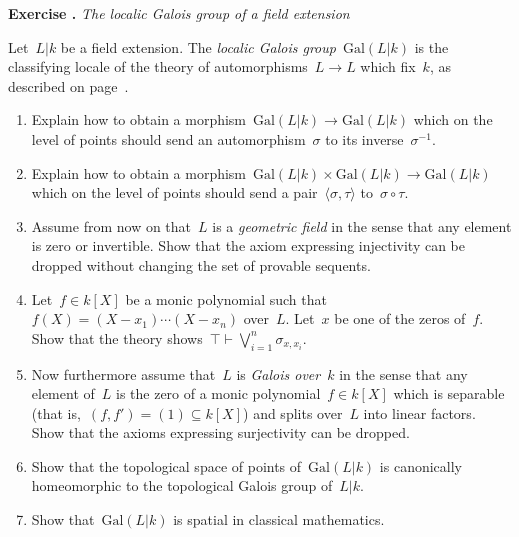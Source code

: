 \documentclass{ws-rv9x6}
\newlength{\exerciseskip}
\newcounter{exercisenr}
\newenvironment{exercise}[1]{
  \refstepcounter{exercisenr}
  \noindent\textbf{Exercise \theexercisenr{}.} \emph{#1} \smallskip\par\noindent%
}{\par\vspace{\exerciseskip}}
\newcommand{\Gal}{\mathrm{Gal}}
\renewcommand{\_}{\mathpunct{.}}
\newcommand{\?}{\,{:}\,}
\begin{document}
\begin{exercise}{The localic Galois group of a field extension}%
Let~$L|k$ be a field extension. The \emph{localic Galois group}~$\Gal(L|k)$
is the classifying locale of the theory of automorphisms~$L \to L$ which
fix~$k$, as described on page~\pageref{par:theory-automorphisms}.
\begin{enumerate}
\item Explain how to obtain a morphism~$\Gal(L|k) \to \Gal(L|k)$ which on the
level of points should send an automorphism~$\sigma$ to its inverse~$\sigma^{-1}$.
\item Explain how to obtain a morphism~$\Gal(L|k) \times \Gal(L|k) \to \Gal(L|k)$ which on the
level of points should send a pair~$\langle \sigma, \tau \rangle$ to~$\sigma \circ \tau$.
\item Assume from now on that~$L$ is a \emph{geometric field} in the sense that any
element is zero or invertible. Show that the axiom expressing injectivity can
be dropped without changing the set of provable sequents.
\item Let~$f \in k[X]$ be a monic polynomial such that~$f(X) =
(X-x_1)\cdots(X-x_n)$ over~$L$. Let~$x$ be one of the zeros of~$f$. Show that
the theory shows~$\top \vdash \bigvee_{i=1}^n \sigma_{x,x_i}$.
\item Now furthermore assume that~$L$ is \emph{Galois over}~$k$ in the sense that
any element of~$L$ is the zero of a monic polynomial~$f \in k[X]$ which is
separable (that is,~$(f,f') = (1) \subseteq k[X]$) and splits over~$L$ into
linear factors. Show that the axioms expressing surjectivity can be dropped.
\item Show that the topological space of points of~$\Gal(L|k)$ is canonically
homeomorphic to the topological Galois group of~$L|k$.
\item Show that~$\Gal(L|k)$ is spatial in classical mathematics.
\end{enumerate}
\end{exercise}
\end{document}
